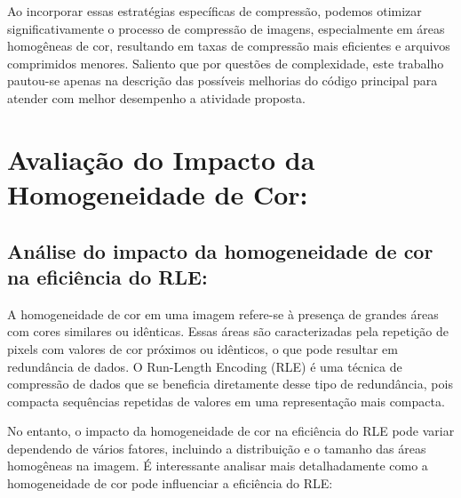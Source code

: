 \documentclass{article}
\begin{document}
Ao incorporar essas estratégias específicas de compressão, podemos otimizar significativamente o processo de compressão de imagens, especialmente em áreas homogêneas de cor, resultando em taxas de compressão mais eficientes e arquivos comprimidos menores. Saliento que por questões de complexidade, este trabalho pautou-se apenas na descrição das possíveis melhorias do código principal para atender com melhor desempenho a atividade proposta.

\section{Avaliação do Impacto da Homogeneidade de Cor:}
\subsection{Análise do impacto da homogeneidade de cor na eficiência do RLE:}

A homogeneidade de cor em uma imagem refere-se à presença de grandes áreas com cores similares ou idênticas. Essas áreas são caracterizadas pela repetição de pixels com valores de cor próximos ou idênticos, o que pode resultar em redundância de dados. O Run-Length Encoding (RLE) é uma técnica de compressão de dados que se beneficia diretamente desse tipo de redundância, pois compacta sequências repetidas de valores em uma representação mais compacta.

No entanto, o impacto da homogeneidade de cor na eficiência do RLE pode variar dependendo de vários fatores, incluindo a distribuição e o tamanho das áreas homogêneas na imagem. É interessante analisar mais detalhadamente como a homogeneidade de cor pode influenciar a eficiência do RLE:
\end{document}
